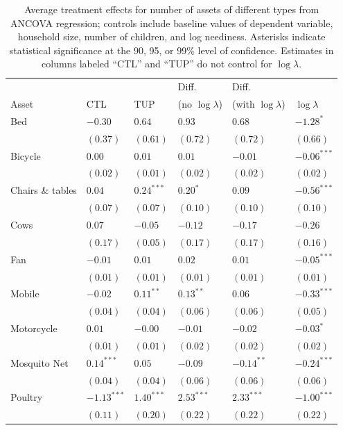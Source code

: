 \documentclass[11pt]{article}
\begin{document}
\begin{table}[htb]
\caption{\label{tab:asset_count_results}Average treatment effects for number of assets of different types from ANCOVA regression; controls include baseline values of dependent variable, household size, number of children, and log neediness.  Asterisks indicate statistical significance at the 90, 95, or 99\% level of confidence.  Estimates in columns labeled ``CTL'' and ``TUP'' do not control for $\log\lambda$.}
\centering
\begin{tabular}{llllll}
 &  &  & Diff. & Diff. & \\
Asset & CTL & TUP & (no $\log\lambda$) & (with $\log\lambda$) & $\log\lambda$\\
\hline
Bed & $-0.30$ & $0.64$ & $0.93$ & $0.68$ & $-1.28^{*}$\\
 & $(0.37)$ & $(0.61)$ & $(0.72)$ & $(0.72)$ & $(0.66)$\\
Bicycle & $0.00$ & $0.01$ & $0.01$ & $-0.01$ & $-0.06^{***}$\\
 & $(0.02)$ & $(0.01)$ & $(0.02)$ & $(0.02)$ & $(0.02)$\\
Chairs \& tables & $0.04$ & $0.24^{***}$ & $0.20^{*}$ & $0.09$ & $-0.56^{***}$\\
 & $(0.07)$ & $(0.07)$ & $(0.10)$ & $(0.10)$ & $(0.10)$\\
Cows & $0.07$ & $-0.05$ & $-0.12$ & $-0.17$ & $-0.26$\\
 & $(0.17)$ & $(0.05)$ & $(0.17)$ & $(0.17)$ & $(0.16)$\\
Fan & $-0.01$ & $0.01$ & $0.02$ & $0.01$ & $-0.05^{***}$\\
 & $(0.01)$ & $(0.01)$ & $(0.01)$ & $(0.01)$ & $(0.01)$\\
Mobile & $-0.02$ & $0.11^{**}$ & $0.13^{**}$ & $0.06$ & $-0.33^{***}$\\
 & $(0.04)$ & $(0.04)$ & $(0.06)$ & $(0.06)$ & $(0.05)$\\
Motorcycle & $0.01$ & $-0.00$ & $-0.01$ & $-0.02$ & $-0.03^{*}$\\
 & $(0.01)$ & $(0.01)$ & $(0.02)$ & $(0.02)$ & $(0.02)$\\
Mosquito Net & $0.14^{***}$ & $0.05$ & $-0.09$ & $-0.14^{**}$ & $-0.24^{***}$\\
 & $(0.04)$ & $(0.04)$ & $(0.06)$ & $(0.06)$ & $(0.06)$\\
Poultry & $-1.13^{***}$ & $1.40^{***}$ & $2.53^{***}$ & $2.33^{***}$ & $-1.00^{***}$\\
 & $(0.11)$ & $(0.20)$ & $(0.22)$ & $(0.22)$ & $(0.22)$\\

\end{tabular}
\end{table}
\end{document}
